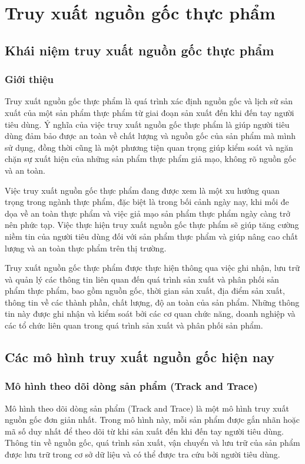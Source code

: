 \chapter{Truy xuất nguồn gốc thực phẩm}
\section{Khái niệm truy xuất nguồn gốc thực phẩm}
\subsection{Giới thiệu}

Truy xuất nguồn gốc thực phẩm là quá trình xác định nguồn gốc và lịch sử sản xuất
của một sản phẩm thực phẩm từ giai đoạn sản xuất đến khi đến tay người tiêu dùng. Ý
nghĩa của việc truy xuất nguồn gốc thực phẩm là giúp người tiêu dùng đảm bảo được
an toàn về chất lượng và nguồn gốc của sản phẩm mà mình sử dụng, đồng thời cũng là
một phương tiện quan trọng giúp kiểm soát và ngăn chặn sự xuất hiện của những sản
phẩm thực phẩm giả mạo, không rõ nguồn gốc và an toàn.

Việc truy xuất nguồn gốc thực phẩm đang được xem là một xu hướng quan trọng
trong ngành thực phẩm, đặc biệt là trong bối cảnh ngày nay, khi mối đe dọa về an toàn
thực phẩm và việc giả mạo sản phẩm thực phẩm ngày càng trở nên phức tạp. Việc thực
hiện truy xuất nguồn gốc thực phẩm sẽ giúp tăng cường niềm tin của người tiêu dùng
đối với sản phẩm thực phẩm và giúp nâng cao chất lượng và an toàn thực phẩm trên thị
trường.

Truy xuất nguồn gốc thực phẩm được thực hiện thông qua việc ghi nhận, lưu trữ
và quản lý các thông tin liên quan đến quá trình sản xuất và phân phối sản phẩm thực
phẩm, bao gồm nguồn gốc, thời gian sản xuất, địa điểm sản xuất, thông tin về các thành
phần, chất lượng, độ an toàn của sản phẩm. Những thông tin này được ghi nhận và kiểm
soát bởi các cơ quan chức năng, doanh nghiệp và các tổ chức liên quan trong quá trình
sản xuất và phân phối sản phẩm.

\section{Các mô hình truy xuất nguồn gốc hiện nay}
\subsection{Mô hình theo dõi dòng sản phẩm (Track and Trace)}
Mô hình theo dõi dòng sản phẩm (Track and Trace) là một mô hình 
truy xuất nguồn gốc đơn giản nhất. Trong mô hình này, mỗi sản phẩm được gắn 
nhãn hoặc mã số duy nhất để theo dõi từ khi sản xuất đến khi đến tay người 
tiêu dùng. Thông tin về nguồn gốc, quá trình sản xuất, vận chuyển và lưu trữ 
của sản phẩm được lưu trữ trong cơ sở dữ liệu và có thể được tra cứu bởi người tiêu dùng.

